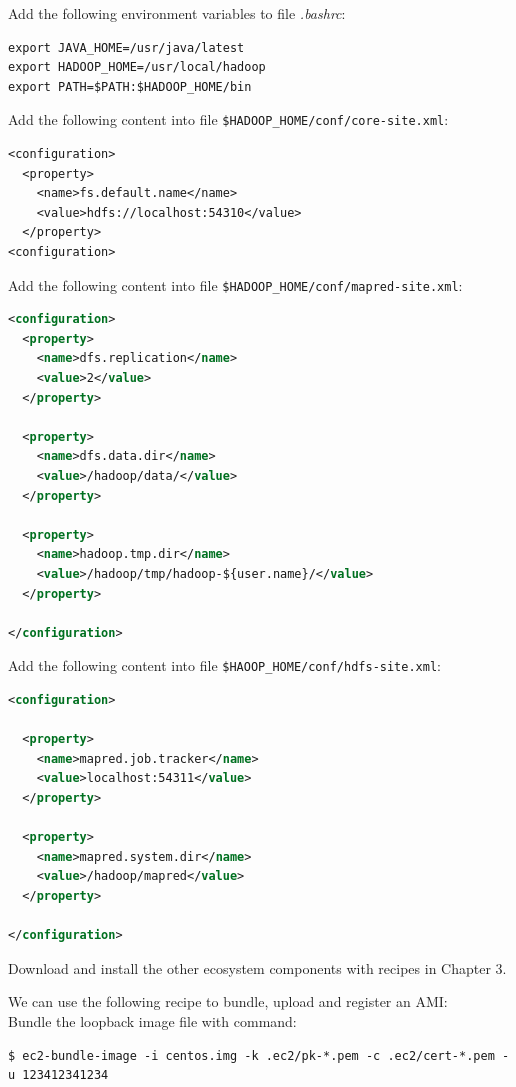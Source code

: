 Add the following environment variables to file \emph{.bashrc}:
\lstset{style=bashstyle}
\begin{lstlisting}
export JAVA_HOME=/usr/java/latest
export HADOOP_HOME=/usr/local/hadoop
export PATH=$PATH:$HADOOP_HOME/bin
\end{lstlisting}

Add the following content into file \verb|$HADOOP_HOME/conf/core-site.xml|:
\lstset{style=bashstyle}
\begin{lstlisting}
<configuration>
  <property>
    <name>fs.default.name</name>
    <value>hdfs://localhost:54310</value>
  </property>
<configuration>
\end{lstlisting}

Add the following content into file \verb|$HADOOP_HOME/conf/mapred-site.xml|:
\lstset{style=bashstyle}
\begin{lstlisting}[language=XML]
<configuration>
  <property>
    <name>dfs.replication</name>
    <value>2</value>
  </property>

  <property>
    <name>dfs.data.dir</name>
    <value>/hadoop/data/</value>
  </property>

  <property>
    <name>hadoop.tmp.dir</name>
    <value>/hadoop/tmp/hadoop-${user.name}/</value>
  </property>

</configuration>
\end{lstlisting}

Add the following content into file \verb|$HAOOP_HOME/conf/hdfs-site.xml|:
\lstset{style=bashstyle}
\begin{lstlisting}[language=XML]
<configuration>

  <property>
    <name>mapred.job.tracker</name>
    <value>localhost:54311</value>
  </property>

  <property>
    <name>mapred.system.dir</name>
    <value>/hadoop/mapred</value>
  </property>

</configuration>
\end{lstlisting}

Download and install the other ecosystem components with recipes in Chapter 3.

We can use the following recipe to bundle, upload and register an AMI: \\
Bundle the loopback image file with command:
\lstset{style=bashstyle}
\begin{lstlisting}
$ ec2-bundle-image -i centos.img -k .ec2/pk-*.pem -c .ec2/cert-*.pem -u 123412341234
\end{lstlisting}

